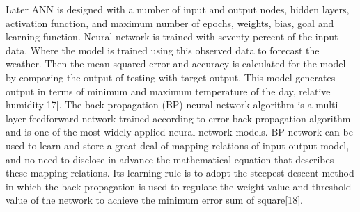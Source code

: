  Later ANN is designed with a number of input and output nodes, hidden layers, activation function, and maximum number of epochs, weights, bias, goal and learning function. Neural network is trained with seventy percent of the input data. Where the model is trained using this observed data to forecast the weather. Then the mean squared error and accuracy is calculated for the model by comparing the output of testing with target output. This model generates output in terms of minimum and maximum temperature of the day, relative humidity[17].
The back propagation (BP) neural network algorithm is a multi-layer feedforward network trained according to error back propagation algorithm and is one of the most widely applied neural network models. BP network can be used to learn and store a great deal of mapping relations of input-output model, and no need to disclose in advance the mathematical equation that describes these mapping relations. Its learning rule is to adopt the steepest descent method in which the back propagation is used to regulate the weight value and threshold value of the network to achieve the minimum error sum of square[18].
 \pagebreak
